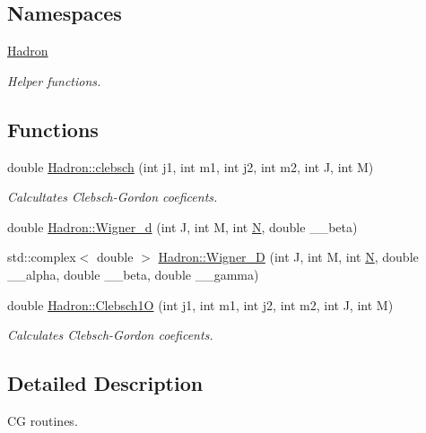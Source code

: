 \subsection*{Namespaces}
\begin{DoxyCompactItemize}
\item 
 \mbox{\hyperlink{namespaceHadron}{Hadron}}
\begin{DoxyCompactList}\small\item\em Helper functions. \end{DoxyCompactList}\end{DoxyCompactItemize}
\subsection*{Functions}
\begin{DoxyCompactItemize}
\item 
double \mbox{\hyperlink{namespaceHadron_ac4cba1d4aa3863fdc7991c208b3b9594}{Hadron\+::clebsch}} (int j1, int m1, int j2, int m2, int J, int M)
\begin{DoxyCompactList}\small\item\em Calcultates Clebsch-\/\+Gordon coeficents. \end{DoxyCompactList}\item 
double \mbox{\hyperlink{namespaceHadron_a63c49af65c1d943a78205d3b8b63079a}{Hadron\+::\+Wigner\+\_\+d}} (int J, int M, int \mbox{\hyperlink{adat__devel_2lib_2hadron_2operator__name__util_8cc_a7722c8ecbb62d99aee7ce68b1752f337}{N}}, double \+\_\+\+\_\+beta)
\item 
std\+::complex$<$ double $>$ \mbox{\hyperlink{namespaceHadron_a4d99a17c00bdddfc88a14c0571b74338}{Hadron\+::\+Wigner\+\_\+D}} (int J, int M, int \mbox{\hyperlink{adat__devel_2lib_2hadron_2operator__name__util_8cc_a7722c8ecbb62d99aee7ce68b1752f337}{N}}, double \+\_\+\+\_\+alpha, double \+\_\+\+\_\+beta, double \+\_\+\+\_\+gamma)
\item 
double \mbox{\hyperlink{namespaceHadron_a78e0e843ad34636504d3ab3f2280e5e5}{Hadron\+::\+Clebsch1O}} (int j1, int m1, int j2, int m2, int J, int M)
\begin{DoxyCompactList}\small\item\em Calculates Clebsch-\/\+Gordon coeficents. \end{DoxyCompactList}\end{DoxyCompactItemize}


\subsection{Detailed Description}
CG routines. 

